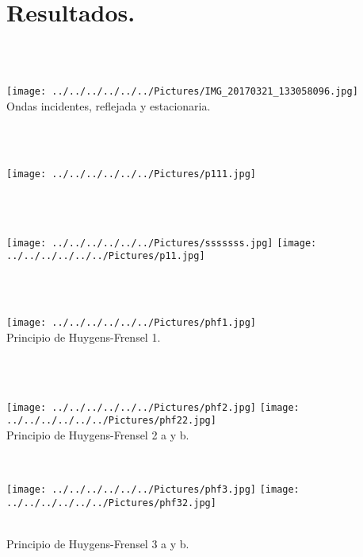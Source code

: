 \documentclass[10pt,a4paper]{article}
\begin{document}
\section*{Resultados.}
\\
\\
\begin{figure 5}
\centering
\texttt{[image: ../../../../../../Pictures/IMG\_20170321\_133058096.jpg]} 
\\
\caption{Ondas incidentes, reflejada y estacionaria.}
\end{figure 5}
\\
\\
\begin{figure 5}
\centering
\texttt{[image: ../../../../../../Pictures/p111.jpg]} 
\\
\end{figure 5}
\\
\\
\medskip
\begin{figure 5}
\centering
\texttt{[image: ../../../../../../Pictures/sssssss.jpg]} 
\texttt{[image: ../../../../../../Pictures/p11.jpg]} 
\\
\end{figure 5}
\\
\\
\medskip
\begin{figure 5}
\centering
\texttt{[image: ../../../../../../Pictures/phf1.jpg]} 
\\
\caption{Principio de Huygens-Frensel 1.}
\end{figure 5}
\\
\\
\medskip
\begin{figure 5}
\centering
\texttt{[image: ../../../../../../Pictures/phf2.jpg]} 
\texttt{[image: ../../../../../../Pictures/phf22.jpg]}
\\
\caption{Principio de Huygens-Frensel 2 a y b.}
\end{figure 5}
\\
\medskip
\begin{figure 5}
\centering
\texttt{[image: ../../../../../../Pictures/phf3.jpg]} 
\texttt{[image: ../../../../../../Pictures/phf32.jpg]} 

\\
\caption{Principio de Huygens-Frensel 3 a y b.}
\end{figure 5}
\\
\\
\end{document}
